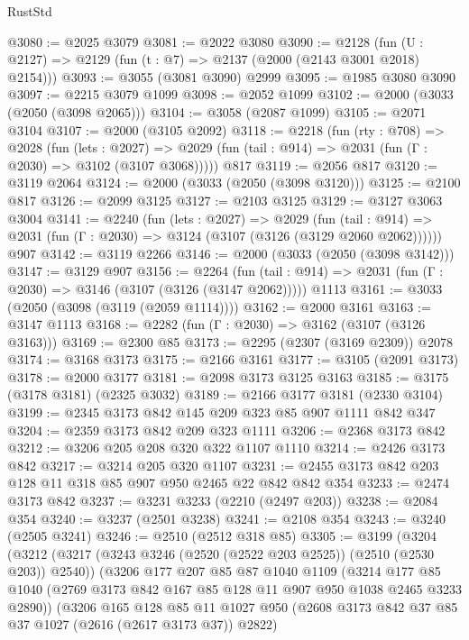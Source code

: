 \begin{lexlean}{RustStd}
\begin{coremodule}
@3080 := @2025 @3079
@3081 := @2022 @3080
@3090 := @2128 (fun (U : @2127) => @2129 (fun (t : @7) => @2137 (@2000 (@2143 @3001 @2018) @2154)))
@3093 := @3055 (@3081 @3090) @2999
@3095 := @1985 @3080 @3090
@3097 := @2215 @3079 @1099
@3098 := @2052 @1099
@3102 := @2000 (@3033 (@2050 (@3098 @2065)))
@3104 := @3058 (@2087 @1099)
@3105 := @2071 @3104
@3107 := @2000 (@3105 @2092)
@3118 := @2218
    (fun (rty : @708) =>
    @2028
      (fun (lets : @2027) =>
      @2029 (fun (tail : @914) => @2031 (fun (Γ : @2030) => @3102 (@3107 @3068)))))
    @817
@3119 := @2056 @817
@3120 := @3119 @2064
@3124 := @2000 (@3033 (@2050 (@3098 @3120)))
@3125 := @2100 @817
@3126 := @2099 @3125
@3127 := @2103 @3125
@3129 := @3127 @3063 @3004
@3141 := @2240
    (fun (lets : @2027) =>
    @2029
      (fun (tail : @914) => @2031 (fun (Γ : @2030) => @3124 (@3107 (@3126 (@3129 @2060 @2062))))))
    @907
@3142 := @3119 @2266
@3146 := @2000 (@3033 (@2050 (@3098 @3142)))
@3147 := @3129 @907
@3156 := @2264
    (fun (tail : @914) => @2031 (fun (Γ : @2030) => @3146 (@3107 (@3126 (@3147 @2062)))))
    @1113
@3161 := @3033 (@2050 (@3098 (@3119 (@2059 @1114))))
@3162 := @2000 @3161
@3163 := @3147 @1113
@3168 := @2282 (fun (Γ : @2030) => @3162 (@3107 (@3126 @3163)))
@3169 := @2300 @85
@3173 := @2295 (@2307 (@3169 @2309)) @2078
@3174 := @3168 @3173
@3175 := @2166 @3161
@3177 := @3105 (@2091 @3173)
@3178 := @2000 @3177
@3181 := @2098 @3173 @3125 @3163
@3185 := @3175 (@3178 @3181) (@2325 @3032)
@3189 := @2166 @3177 @3181 (@2330 @3104)
@3199 := @2345 @3173 @842 @145 @209 @323 @85 @907 @1111 @842 @347
@3204 := @2359 @3173 @842 @209 @323 @1111
@3206 := @2368 @3173 @842
@3212 := @3206 @205 @208 @320 @322 @1107 @1110
@3214 := @2426 @3173 @842
@3217 := @3214 @205 @320 @1107
@3231 := @2455 @3173 @842 @203 @128 @11 @318 @85 @907 @950 @2465 @22 @842 @842 @354
@3233 := @2474 @3173 @842
@3237 := @3231 @3233 (@2210 (@2497 @203))
@3238 := @2084 @354
@3240 := @3237 (@2501 @3238)
@3241 := @2108 @354
@3243 := @3240 (@2505 @3241)
@3246 := @2510 (@2512 @318 @85)
@3305 := @3199
    (@3204
      (@3212
        (@3217 (@3243 @3246 (@2520 (@2522 @203 @2525)) (@2510 (@2530 @203)) @2540))
        (@3206
          @177
          @207
          @85
          @87
          @1040
          @1109
          (@3214
            @177
            @85
            @1040
            (@2769 @3173 @842 @167 @85 @128 @11 @907 @950 @1038 @2465 @3233 @2890))
          (@3206
            @165
            @128
            @85
            @11
            @1027
            @950
            (@2608 @3173 @842 @37 @85 @37 @1027 (@2616 (@2617 @3173 @37)) @2822)

\end{coremodule}
\end{lexlean}
